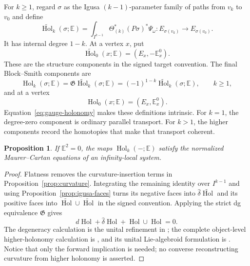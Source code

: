 \documentclass[12pt]{amsart}
\newtheorem{prop}[thm]{Proposition}
\theoremstyle{definition}
\theoremstyle{remark}
\numberwithin{equation}{section}
\newcommand{\1}{{\mathbb{1}}}
\begin{document}
For $k\geq1$, regard $\sigma$ as the Igusa $(k-1)$-parameter family of
paths from $v_k$ to $v_0$ and define
\begin{equation}\label{eq:higher-holonomy}
 \widetilde{\operatorname{Hol}}_k(\sigma;\mathbb E)
 =
 \int_{I^{k-1}}
 \Theta_{(k)}^*(P\sigma)^*\Psi_\omega:
 E_{\sigma(v_k)}\longrightarrow E_{\sigma(v_0)}.
\end{equation}
It has internal degree $1-k$.  At a vertex $x$, put
\[
 \widetilde{\operatorname{Hol}}_0(x;\mathbb E)
 =
 (E_x,-\mathbb E_x^0).
\]
These are the structure components in the signed target convention.
The final Block--Smith components are
\begin{equation}\label{eq:standard-higher-holonomy}
 \operatorname{Hol}_k(\sigma;\mathbb E)
 =
 \mathfrak G\widetilde{\operatorname{Hol}}_k(\sigma;\mathbb E)
 =
 (-1)^{1-k}
 \widetilde{\operatorname{Hol}}_k(\sigma;\mathbb E),
 \qquad k\geq1,
\end{equation}
and at a vertex
\[
 \operatorname{Hol}_0(x;\mathbb E)
 =
 (E_x,\mathbb E_x^0).
\]
Equation~\eqref{eq:gauge-holonomy} makes these definitions intrinsic.
For $k=1$, the degree-zero component is ordinary parallel transport.
For $k>1$, the higher components record the homotopies that make that
transport coherent.

\begin{prop}\label{prop:holonomy-mc}
If $\mathbb E^2=0$, the maps
$\operatorname{Hol}_k(-;\mathbb E)$ satisfy the normalized
Maurer--Cartan equations of an infinity-local system.
\end{prop}

\begin{proof}
Flatness removes the curvature-insertion terms in
Proposition~\ref{prop:curvature}.  Integrating the remaining identity
over $I^{k-1}$ and using Proposition~\ref{prop:igusa-faces} turns its
negative faces into
$\widehat\delta\widetilde{\operatorname{Hol}}$ and its positive faces
into
$\widetilde{\operatorname{Hol}}\cup
\widetilde{\operatorname{Hol}}$ in the signed convention.  Applying
the strict dg equivalence $\mathfrak G$ gives
\[
 d\operatorname{Hol}
 +\widehat\delta\operatorname{Hol}
 +\operatorname{Hol}\cup\operatorname{Hol}=0.
\]
The degeneracy calculation is
the unital refinement in \cite[Proposition 3.26]{AS12}; the complete
object-level higher-holonomy calculation is
\cite[Section 4.1]{BS14}, and its unital Lie-algebroid formulation is
\cite[Theorem 4.13]{AS12}.  Notice that only the forward implication
is needed; no converse reconstructing curvature from higher holonomy
is asserted.
\end{proof}
\end{document}
